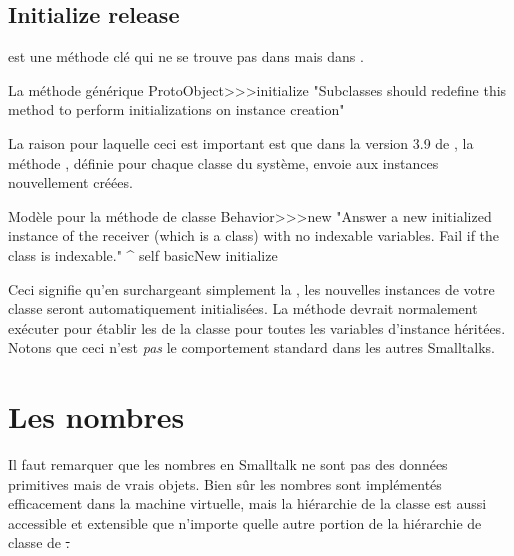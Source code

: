 \documentclass[a4paper,10pt,twoside]{book}
\begin{document}

\subsection{Initialize release}

 est une méthode clé qui ne se trouve pas dans  mais dans .

\begin{method}{La méthode générique }
ProtoObject>>>initialize
    "Subclasses should redefine this method to perform initializations on instance creation"
\end{method}

La raison pour laquelle ceci est important est que dans la version 3.9 de \squeak, la méthode , définie pour chaque classe du système, envoie  aux instances nouvellement créées.

\begin{method}{Modèle pour la méthode de classe }
Behavior>>>new
    "Answer a new initialized instance of the receiver (which is a class) with no indexable
    variables. Fail if the class is indexable."
    ^ self basicNew initialize
\end{method}

Ceci signifie qu'en surchargeant simplement la  , les nouvelles instances de votre classe seront automatiquement initialisées. La méthode  devrait normalement exécuter  pour établir les  de la classe pour toutes les variables d'instance héritées.
Notons que ceci n'est \emph{pas} le comportement standard dans les autres Smalltalks.

\section{Les nombres}
\label{sec:Number}
Il faut remarquer que les nombres en Smalltalk ne sont pas des données primitives mais de vrais objets. Bien sûr les nombres sont implémentés efficacement dans la machine virtuelle, mais la hiérarchie de la classe  est aussi accessible et extensible que n'importe quelle autre portion de la hiérarchie de classe de \st.
\end{document}
